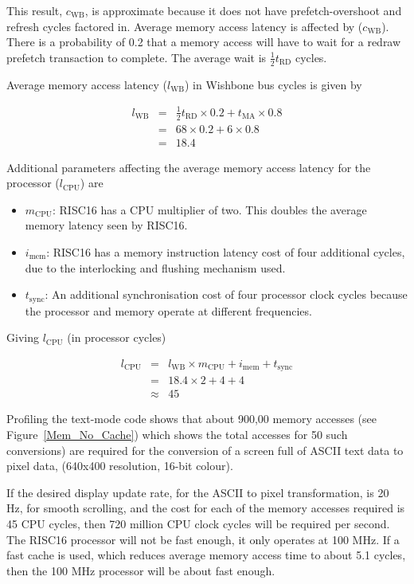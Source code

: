 This result, $c_\mathrm{WB}$, is approximate because it does not have
prefetch-overshoot and refresh cycles factored in. Average memory access latency
is affected by ($c_\mathrm{WB}$). There is a probability of 0.2 that a memory
access will have to wait for a redraw prefetch transaction to complete. The
average wait is $\frac{1}{2}t_\mathrm{RD}$ cycles.

Average memory access latency ($l_\mathrm{WB}$) in Wishbone bus cycles is given
by

\begin{eqnarray*}
l_\mathrm{WB}	& = & \frac{1}{2}t_\mathrm{RD}\times 0.2 + t_\mathrm{MA} \times
0.8 \\
& = & 68 \times 0.2 + 6 \times 0.8 \\
& = & 18.4
\end{eqnarray*}

Additional parameters affecting the average memory access latency for the
processor ($l_\mathrm{CPU}$) are
\begin{itemize}
  \item $m_\mathrm{CPU}$: RISC16 has a CPU multiplier of two. This doubles
  the average memory latency seen by RISC16.
  \item $i_\mathrm{mem}$: RISC16 has a memory instruction latency cost of four
  additional cycles, due to the interlocking and flushing mechanism used.
  \item $t_\mathrm{sync}$: An additional synchronisation cost of four
  processor clock cycles because the processor and memory operate at different
  frequencies.
\end{itemize}
Giving $l_\mathrm{CPU}$ (in processor cycles)

\begin{eqnarray*}
l_\mathrm{CPU}	& = & l_\mathrm{WB} \times m_\mathrm{CPU} + i_\mathrm{mem} +
t_\mathrm{sync} \\
				& = & 18.4 \times 2 + 4 + 4 \\
				& \approx & 45
\end{eqnarray*}

Profiling the text-mode code shows that about 900,00 memory accesses (see
Figure~\ref{Mem_No_Cache}) which shows the total accesses for 50 such
conversions) are required for the conversion of a screen full of ASCII text data
to pixel data, (640x400 resolution, 16-bit colour).

If the desired display update rate, for the ASCII to pixel transformation, is 20
Hz, for smooth scrolling, and the cost for each of the memory accesses required
is 45 CPU cycles, then 720 million CPU clock cycles will be required per second.
The RISC16 processor will not be fast enough, it only operates at 100 MHz. If a
fast cache is used, which reduces average memory access time to about 5.1 cycles,
then the 100 MHz processor will be about fast enough.

